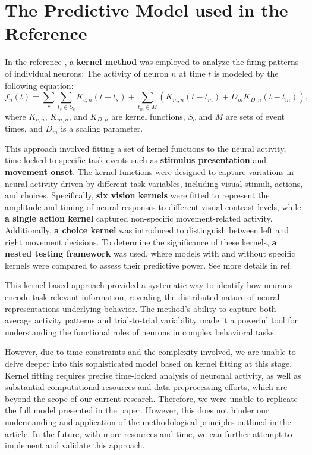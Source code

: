 \documentclass{article}
\begin{document}
	\section{The Predictive Model used in the Reference}
	\par In the reference \cite{ref1}, a \textbf{kernel method} was employed to analyze the firing patterns of individual neurons: The activity of neuron $ n $ at time $ t $ is modeled by the following equation:
	$$f_n(t) = \sum_{c} \sum_{t_s \in S_c} K_{c,n}(t - t_s) + \sum_{t_m \in M} \left( K_{m,n}(t - t_m) + D_m K_{D,n}(t - t_m) \right),$$
	where $ K_{c,n} $, $ K_{m,n} $, and $ K_{D,n} $ are kernel functions, $ S_c $ and $ M $ are sets of event times, and $ D_m $ is a scaling parameter.
	 \par This approach involved fitting a set of kernel functions to the neural activity, time-locked to specific task events such as \textbf{stimulus presentation} and\textbf{ movement onset}. The kernel functions were designed to capture variations in neural activity driven by different task variables, including visual stimuli, actions, and choices. Specifically, \textbf{six vision kernels} were fitted to represent the amplitude and timing of neural responses to different visual contrast levels, while\textbf{ a single action kernel} captured non-specific movement-related activity. Additionally,\textbf{ a choice kernel }was introduced to distinguish between left and right movement decisions. To determine the significance of these kernels, \textbf{a nested testing framework} was used, where models with and without specific kernels were compared to assess their predictive power. See more details in ref\cite{ref1}\cite{ref4}\cite{ref5}\cite{ref6}.
	\par This kernel-based approach provided a systematic way to identify how neurons encode task-relevant information, revealing the distributed nature of neural representations underlying behavior. The method's ability to capture both average activity patterns and trial-to-trial variability made it a powerful tool for understanding the functional roles of neurons in complex behavioral tasks.
	\par However, due to time constraints and the complexity involved, we are unable to delve deeper into this sophisticated model based on kernel fitting at this stage. Kernel fitting requires precise time-locked analysis of neuronal activity, as well as substantial computational resources and data preprocessing efforts, which are beyond the scope of our current research. Therefore, we were unable to replicate the full model presented in the paper. However, this does not hinder our understanding and application of the methodological principles outlined in the article. In the future, with more resources and time, we can further attempt to implement and validate this approach.
	\clearpage
\end{document}
